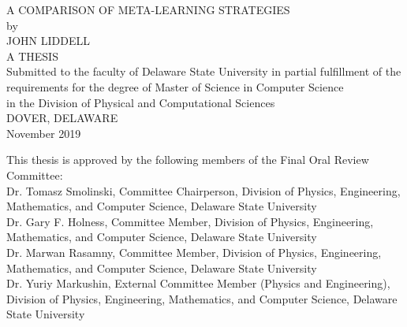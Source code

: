 \begin{titlepage}
  \begin{center}
      A COMPARISON OF META-LEARNING STRATEGIES\\
      \vspace{17mm}
      by\\
      \vspace{10mm}
      JOHN LIDDELL\\
      \vspace{35mm}
      A THESIS\\
      \vspace{7mm}
      Submitted to the faculty of Delaware State University in partial fulfillment of the\\
      requirements for the degree of Master of Science in Computer Science\\
      in the Division of Physical and Computational Sciences\\
      \vspace{7mm}
      DOVER, DELAWARE\\
      November 2019\\
  \end{center}

  \vspace{15mm}

  \begin{flushleft}
    This thesis is approved by the following members of the Final Oral Review Committee:\\
    \vspace{6mm}
    Dr. Tomasz Smolinski, Committee Chairperson, Division of Physics, Engineering, Mathematics, and Computer Science, Delaware State University\\
    \vspace{3mm}
    Dr. Gary F. Holness, Committee Member, Division of Physics, Engineering, Mathematics, and Computer Science, Delaware State University\\
    \vspace{3mm}
    Dr. Marwan Rasamny, Committee Member, Division of Physics, Engineering, Mathematics, and Computer Science, Delaware State University\\
    \vspace{3mm}
    Dr. Yuriy Markushin, External Committee Member (Physics and Engineering), Division of Physics, Engineering, Mathematics, and Computer Science, Delaware State University\\
  \end{flushleft}
\end{titlepage}
